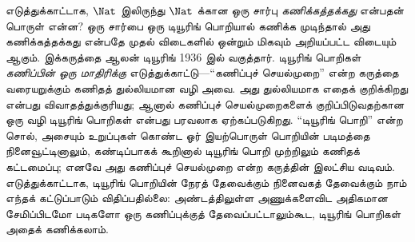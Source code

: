 \documentclass[../../../include/open-logic-section]{subfiles}
\begin{document}


எடுத்துக்காட்டாக, $\Nat$ இலிருந்து $\Nat$ க்கான ஒரு சார்பு
\emph{கணிக்கத்தக்கது} என்பதன் பொருள் என்ன? ஒரு சார்பை ஒரு டியூரிங்
பொறியால் கணிக்க முடிந்தால் அது கணிக்கத்தக்கது என்பதே முதல்
விடைகளில் ஒன்றும் மிகவும் அறியப்பட்ட விடையும் ஆகும். இக்கருத்தை
ஆலன் டியூரிங் 1936 இல் வகுத்தார். டியூரிங் பொறிகள்
\emph{கணிப்பின் ஒரு மாதிரிக்கு} எடுத்துக்காட்டு---``கணிப்புச்
செயல்முறை'' என்ற கருத்தை வரையறுக்கும் கணிதத் துல்லியமான வழி அவை.
அது துல்லியமாக எதைக் குறிக்கிறது என்பது விவாதத்துக்குரியது;
ஆனால் கணிப்புச் செயல்முறைகளைக் குறிப்பிடுவதற்கான ஒரு வழி டியூரிங்
பொறிகள் என்பது பரவலாக ஏற்கப்படுகிறது. ``டியூரிங் பொறி'' என்ற சொல்,
அசையும் உறுப்புகள் கொண்ட ஓர் இயற்பொருள் பொறியின் படிமத்தை
நினைவூட்டினாலும், கண்டிப்பாகக் கூறினால் டியூரிங் பொறி முற்றிலும்
கணிதக் கட்டமைப்பு; எனவே அது கணிப்புச் செயல்முறை என்ற கருத்தின்
இலட்சிய வடிவம். எடுத்துக்காட்டாக, டியூரிங் பொறியின் நேரத் தேவைக்கும்
நினைவகத் தேவைக்கும் நாம் எந்தக் கட்டுப்பாடும் விதிப்பதில்லை:
அண்டத்திலுள்ள அணுக்களைவிட அதிகமான சேமிப்பிடமோ படிகளோ ஒரு
கணிப்புக்குத் தேவைப்பட்டாலும்கூட, டியூரிங் பொறிகள் அதைக் கணிக்கலாம்.
\end{document}
